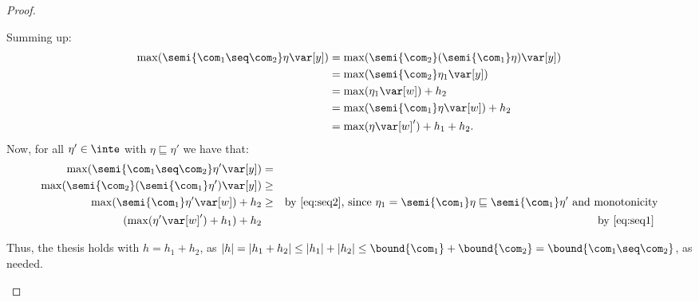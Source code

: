 \begin{proof}
\begin{inductive}
    Summing up:
    \begin{align*}
      \max(\semi{\com_1 \seq \com_2}\eta \var[y])
      &= \max(\semi{\com_2}(\semi{\com_1}\eta) \var[y])\\
      & = \max(\semi{\com_2}\eta_1 \var[y])\\
      & = \max(\eta_1 \var[w]) + h_2\\
      & = \max(\semi{\com_1}\eta \var[w]) + h_2\\
      & = \max(\eta \var[w]')+h_1 + h_2.
    \end{align*}
    Now, for all \(\eta' \in \inte\) with \(\eta \sqsubseteq \eta'\) we have that:
    \begin{align*}
      \max(\semi{\com_1 \seq \com_2}\eta' \var[y]) & = & \\ 
      \max(\semi{\com_2}(\semi{\com_1}\eta') \var[y]) & \geq & \\ 
      \max(\semi{\com_1}\eta' \var[w]) + h_2 & \geq & 
                                                      \text{by\ \eqref{eq:seq2}, since } \eta_1 = \semi{\com_1}\eta \sqsubseteq \semi{\com_1}\eta' \text{ and monotonicity} \\
      (\max(\eta' \var[w]') +h_1) + h_2 & & \text{by\ \eqref{eq:seq1}}\
    \end{align*}

    Thus, the thesis holds with \(h= h_1+h_2\), as
    \(|h| =|h_1 +h_2| \leq |h_1| + |h_2| \leq \bound{\com_1} +
    \bound{\com_2} = \bound{\com_1 \seq \com_2}\), as needed.

    

\end{inductive}
\end{proof}
